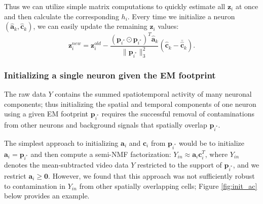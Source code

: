 \documentclass[10pt,letterpaper]{article}
\begin{document}
{Thus we can utilize simple matrix computations to quickly estimate all $\bm{z}_i$ at once and then calculate the corresponding $h_i$. Every time we initialize a neuron $(\hat{\bm{a}}_k, \hat{\bm{c}}_k)$, we can easily update the remaining $\bm{z}_i$ values:
\begin{equation}
    \bm{z}_i^{new} = \bm{z}_i^{old}- \frac{(\bm{p}_{i^*}\odot \bm{p}_{i^*})^T\hat{\bm{a}}_k}{\|\bm{p}_{i^*}\|_3^2} (\hat{\bm{c}}_k-\bar{\hat{\bm{c}}}_k). 
\end{equation}



\subsubsection{Initializing a single neuron given the EM footprint}
\label{sec:init}
The raw data $Y$ contains the summed spatiotemporal activity of many neuronal components; thus initializing the spatial and temporal components of one neuron using a given EM footprint $\bm{p}_{i^*}$ requires the successful removal of contaminations from other neurons and background signals that spatially overlap $\bm{p}_{i^*}$. 

The simplest approach to initializing $\bm{a}_i$ and $\bm{c}_i$ from $\bm{p}_{i^*}$ would be to initialize $\bm{a}_i=\bm{p}_{i^*}$ and then compute a semi-NMF factorization: $Y_{in} \approx \bm{a}_i\bm{c}_i^T$, where $Y_{in}$ denotes the mean-subtracted video data $Y$ restricted to the support of $\bm{p}_{i^*}$, and we restrict $\bm{a}_i\geq \bm{0}$.  However, we found that this approach was not sufficiently robust to contamination in $Y_{in}$ from other spatially overlapping cells; Figure \ref{fig:init_ac} below provides an example.

}
\end{document}

